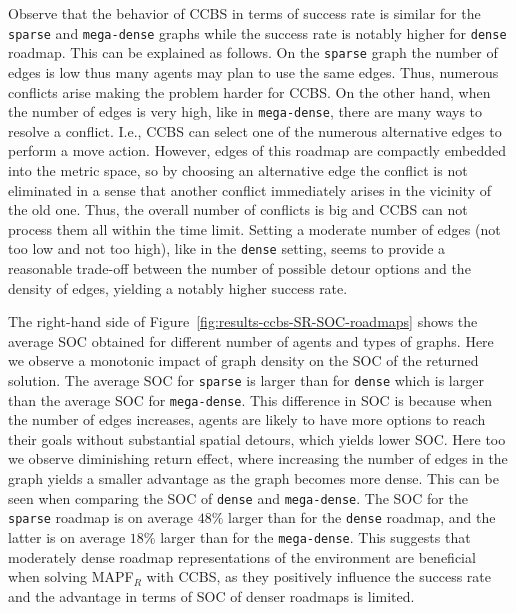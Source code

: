 \documentclass[review]{elsarticle}
\newcommand\konstantin[1]{\nb{\textbf{Konstantin:}}{red}{#1}}
\newcommand\roni[1]{\nb{\textbf{Roni:}}{green}{#1}}
\newcommand{\ccbs}{\ac{CCBS}\xspace}
\newcommand{\mapfr}{\ac{MAPF}$_R$\xspace}
\begin{document}
Observe that the behavior of \ccbs in terms of success rate is similar for the \texttt{sparse} and \texttt{mega-dense} graphs while the success rate is notably higher for \texttt{dense} roadmap. This can be explained as follows. On the \texttt{sparse} graph the number of edges is low thus many agents may plan to use the same edges. Thus, numerous conflicts arise making the problem harder for \ccbs. On the other hand, when the number of edges is very high, like in \texttt{mega-dense}, there are many ways to resolve a conflict. I.e., \ccbs can select one of the numerous alternative edges to perform a move action. However, edges of this roadmap are compactly embedded into the metric space, so by choosing an alternative edge the conflict is not eliminated in a sense that another conflict immediately arises in the vicinity of the old one. Thus, the overall number of conflicts is big and \ccbs can not process them all within the time limit. Setting a moderate number of edges (not too low and not too high), like in the \texttt{dense} setting, seems to provide a reasonable trade-off between the number of possible detour options and the density of edges, yielding a notably higher success rate.

The right-hand side of Figure~\ref{fig:results-ccbs-SR-SOC-roadmaps} shows the average SOC obtained for different number of agents and types of graphs. Here we observe a monotonic impact of graph density on the SOC of the returned solution. The average SOC for \texttt{sparse} is larger than for \texttt{dense} which is larger than the average SOC for \texttt{mega-dense}. 
This difference in SOC is because %
when the number of edges increases, agents are likely to have more options to reach their goals without substantial spatial detours, which yields lower SOC. 
Here too we observe diminishing return effect, where increasing the number of edges in the graph yields a smaller advantage as the graph becomes more dense. This can be seen when comparing the SOC of \texttt{dense} and \texttt{mega-dense}. %
The SOC for the \texttt{sparse} roadmap is on average $48\%$ larger than for the \texttt{dense} roadmap, and the latter is on average $18\%$ larger than for the \texttt{mega-dense}.
This suggests that moderately dense roadmap representations of the environment are beneficial when solving \mapfr with \ccbs, as they positively influence the success rate and the advantage in terms of SOC of denser roadmaps is limited.
\end{document}

